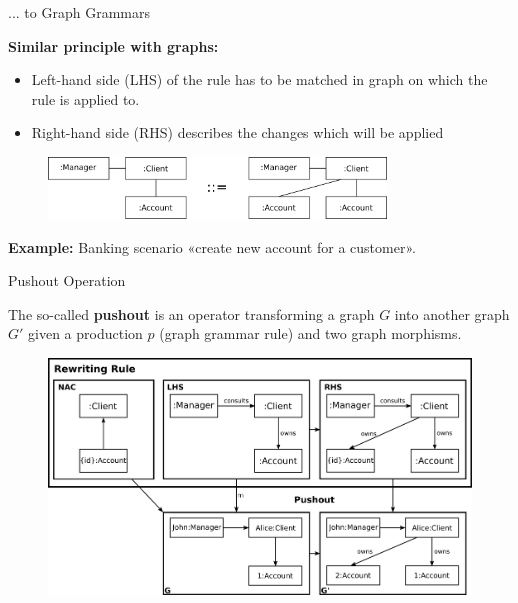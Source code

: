 \documentclass[10pt]{beamer}
\begin{document}
\begin{frame}{... to Graph Grammars}

	\textbf{Similar principle with graphs:}

	\begin{itemize}
		\item Left-hand side (LHS) of the rule has to be matched in graph on which the rule is applied to.
		\item Right-hand side (RHS) describes the changes which will be applied
	\end{itemize}

	\begin{figure}[H]
		\centering
		\includegraphics[width=0.8\textwidth]{grammar_rule_example}
	\end{figure} 
	
	\textbf{Example:} Banking scenario «create new account for a customer».

\end{frame}

\begin{frame}{Pushout Operation}

The so-called \textbf{pushout} is an operator transforming a graph $G$ into another graph $G'$ given a production $p$ (graph grammar rule) and two graph morphisms.

\begin{figure}[H]
	\centering
	\includegraphics[width=1.0\textwidth]{banking-example-pushout}
\end{figure} 

\end{frame}
\end{document}
